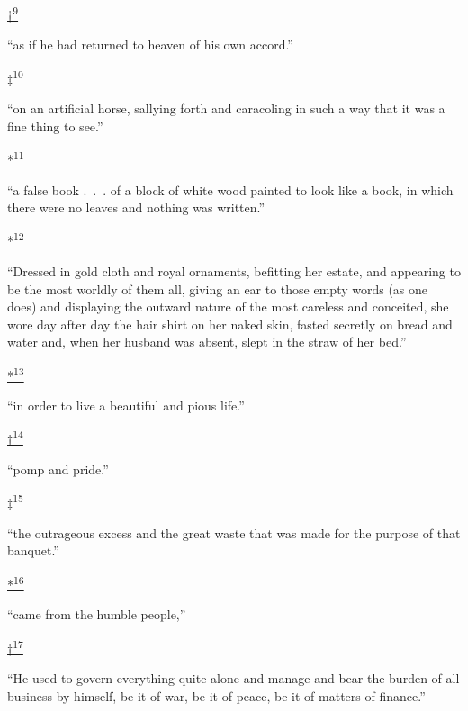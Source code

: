 \protect\hypertarget{23_NOTES.xhtmlux5cux23id_2672}{\protect\hyperlink{20_ILLUSTRATIONS_FOLLOW_PAGE.xhtmlux5cux23id_2671}{†\textsuperscript{9}}}
``as if he had returned to heaven of his own accord.''

\protect\hypertarget{23_NOTES.xhtmlux5cux23id_2674}{\protect\hyperlink{20_ILLUSTRATIONS_FOLLOW_PAGE.xhtmlux5cux23id_2673}{‡\textsuperscript{10}}}
``on an artificial horse, sallying forth and caracoling in such a way
that it was a fine thing to see.''

\protect\hypertarget{23_NOTES.xhtmlux5cux23id_2350}{\protect\hyperlink{20_ILLUSTRATIONS_FOLLOW_PAGE.xhtmlux5cux23id_2349}{*\textsuperscript{11}}}
``a false book .~.~. of a block of white wood painted to look like a
book, in which there were no leaves and nothing was written.''

\protect\hypertarget{23_NOTES.xhtmlux5cux23id_2676}{\protect\hyperlink{20_ILLUSTRATIONS_FOLLOW_PAGE.xhtmlux5cux23id_2675}{*\textsuperscript{12}}}
``Dressed in gold cloth and royal ornaments, befitting her estate, and
appearing to be the most worldly of them all, giving an ear to those
empty words (as one does) and displaying the outward nature of the most
careless and conceited, she wore day after day the hair shirt on her
naked skin, fasted secretly on bread and water and, when her husband was
absent, slept in the straw of her bed.''

\protect\hypertarget{23_NOTES.xhtmlux5cux23id_2678}{\protect\hyperlink{20_ILLUSTRATIONS_FOLLOW_PAGE.xhtmlux5cux23id_2677}{*\textsuperscript{13}}}
``in order to live a beautiful and pious life.''

\protect\hypertarget{23_NOTES.xhtmlux5cux23id_2679}{\protect\hyperlink{20_ILLUSTRATIONS_FOLLOW_PAGE.xhtmlux5cux23id_2680}{†\textsuperscript{14}}}
``pomp and pride.''

\protect\hypertarget{23_NOTES.xhtmlux5cux23id_2682}{\protect\hyperlink{20_ILLUSTRATIONS_FOLLOW_PAGE.xhtmlux5cux23id_2681}{‡\textsuperscript{15}}}
``the outrageous excess and the great waste that was made for the
purpose of that banquet.''

\protect\hypertarget{23_NOTES.xhtmlux5cux23id_2684}{\protect\hyperlink{20_ILLUSTRATIONS_FOLLOW_PAGE.xhtmlux5cux23id_2683}{*\textsuperscript{16}}}
``came from the humble people,''

\protect\hypertarget{23_NOTES.xhtmlux5cux23id_2686}{\protect\hyperlink{20_ILLUSTRATIONS_FOLLOW_PAGE.xhtmlux5cux23id_2685}{†\textsuperscript{17}}}
``He used to govern everything quite alone and manage and bear the
burden of all business by himself, be it of war, be it of peace, be it
of matters of finance.''

